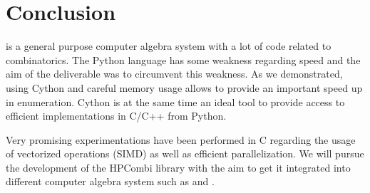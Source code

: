 \documentclass{deliverablereport}
\begin{document}

\section{Conclusion}
\Sage is a general purpose computer algebra system with a lot of code related
to combinatorics. The Python language has some weakness regarding speed and the
aim of the deliverable was to circumvent this weakness. As we demonstrated,
using Cython and careful memory usage allows to provide an
important speed up in enumeration. Cython is at the same time an ideal
tool to provide access to efficient implementations in C/C++ from Python.

Very promising experimentations have been performed in C regarding the usage
of vectorized operations (SIMD) as well as efficient parallelization. We will
pursue the development of the HPCombi library with the aim to get it
integrated into different computer algebra system such as \Sage and \GAP.

\printbibliography
\end{document}
